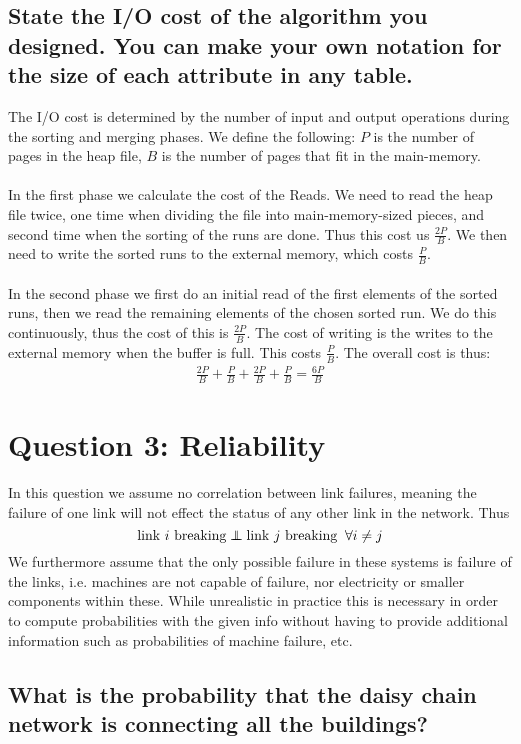 \documentclass{article}
\newcommand\independent{\protect\mathpalette{\protect\independenT}{\perp}}
\def\independenT#1#2{\mathrel{\rlap{$#1#2$}\mkern2mu{#1#2}}}
\begin{document}
\subsection{State the I/O cost of the algorithm you designed. You can make your own notation for the size of each attribute in any table.}
The I/O cost is determined by the number of input and output operations during the sorting and merging phases. We define the following: $P$ is the number of pages in the heap file, $B$ is the number of pages that fit in the main-memory.
\\\\
In the first phase we calculate the cost of the Reads. We need to read the heap file twice, one time when dividing the file into main-memory-sized pieces, and second time when the sorting of the runs are done. Thus this cost us $\frac{2P}{B}$. We then need to write the sorted runs to the external memory, which costs $\frac{P}{B}$. 
\\\\
In the second phase we first do an initial read of the first elements of the sorted runs, then we read the remaining elements of the chosen sorted run. We do this continuously, thus the cost of this is $\frac{2P}{B}$. The cost of writing is the writes to the external memory when the buffer is full. This costs $\frac{P}{B}$. The overall cost is thus: 
\begin{align*}
    \frac{2P}{B} + \frac{P}{B} + \frac{2P}{B} + \frac{P}{B} = \frac{6P}{B}
\end{align*}



\section{Question 3: Reliability}
In this question we assume no correlation between link failures, meaning the failure of one link will not effect the status of any other link in the network. Thus
$$
\text{link }i\text{ breaking} \independent \text{link }j\text{ breaking} \;\; \forall i\neq j
$$
We furthermore assume that the only possible failure in these systems is failure of the links, i.e. machines are not capable of failure, nor electricity or smaller components within these. While unrealistic in practice this is necessary in order to compute probabilities with the given info without having to provide additional information such as probabilities of machine failure, etc.

\subsection{What is the probability that the daisy chain network is connecting all the buildings?}
\end{document}
